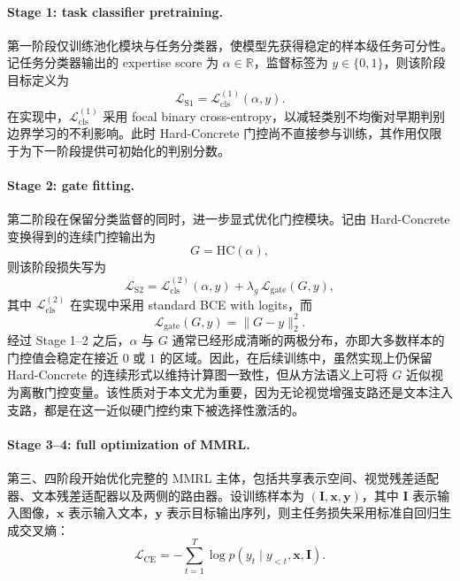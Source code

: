 \documentclass[journal]{IEEEtran}
\begin{document}
\paragraph{Stage 1: task classifier pretraining.}
第一阶段仅训练池化模块与任务分类器，使模型先获得稳定的样本级任务可分性。记任务分类器输出的 expertise score 为 $\alpha\in\mathbb{R}$，监督标签为 $y\in\{0,1\}$，则该阶段目标定义为
\begin{equation}
\mathcal{L}_{\mathrm{S1}}=\mathcal{L}_{\mathrm{cls}}^{(1)}(\alpha,y).
\end{equation}
在实现中，$\mathcal{L}_{\mathrm{cls}}^{(1)}$ 采用 focal binary cross-entropy，以减轻类别不均衡对早期判别边界学习的不利影响。此时 Hard-Concrete 门控尚不直接参与训练，其作用仅限于为下一阶段提供可初始化的判别分数。

\paragraph{Stage 2: gate fitting.}
第二阶段在保留分类监督的同时，进一步显式优化门控模块。记由 Hard-Concrete 变换得到的连续门控输出为
\begin{equation}
G=\mathrm{HC}(\alpha),
\end{equation}
则该阶段损失写为
\begin{equation}
\mathcal{L}_{\mathrm{S2}}
=
\mathcal{L}_{\mathrm{cls}}^{(2)}(\alpha,y)
+
\lambda_{g}\,\mathcal{L}_{\mathrm{gate}}(G,y),
\end{equation}
其中 $\mathcal{L}_{\mathrm{cls}}^{(2)}$ 在实现中采用 standard BCE with logits，而
\begin{equation}
\mathcal{L}_{\mathrm{gate}}(G,y)=\|G-y\|_2^2 .
\end{equation}
经过 Stage 1--2 之后，$\alpha$ 与 $G$ 通常已经形成清晰的两极分布，亦即大多数样本的门控值会稳定在接近 $0$ 或 $1$ 的区域。因此，在后续训练中，虽然实现上仍保留 Hard-Concrete 的连续形式以维持计算图一致性，但从方法语义上可将 $G$ 近似视为离散门控变量。该性质对于本文尤为重要，因为无论视觉增强支路还是文本注入支路，都是在这一近似硬门控约束下被选择性激活的。

\paragraph{Stage 3--4: full optimization of MMRL.}
第三、四阶段开始优化完整的 MMRL 主体，包括共享表示空间、视觉残差适配器、文本残差适配器以及两侧的路由器。设训练样本为 $(\mathbf{I},\mathbf{x},\mathbf{y})$，其中 $\mathbf{I}$ 表示输入图像，$\mathbf{x}$ 表示输入文本，$\mathbf{y}$ 表示目标输出序列，则主任务损失采用标准自回归生成交叉熵：
\begin{equation}
\mathcal{L}_{\mathrm{CE}}
=
-\sum_{t=1}^{T}
\log p\!\left(y_t \mid y_{<t},\mathbf{x},\mathbf{I}\right).
\end{equation}
\end{document}
